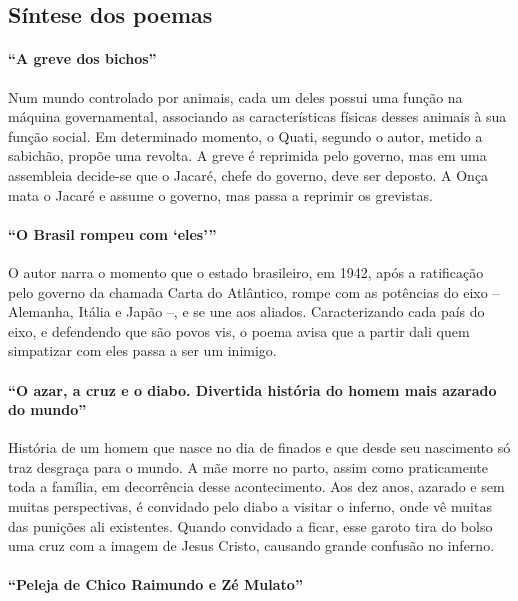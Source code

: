 \subsection{Síntese dos poemas}

\paragraph{``A greve dos bichos''}

Num mundo controlado por animais, cada um deles possui uma função na
máquina governamental, associando as características físicas desses
animais à sua função social. Em determinado momento, o Quati, segundo
o autor, metido a sabichão, propõe uma revolta. A greve é reprimida
pelo governo, mas em uma assembleia decide-se que o Jacaré,
chefe do governo, deve ser deposto. A Onça mata o Jacaré e assume o
governo, mas passa a reprimir os grevistas. 


\paragraph{``O Brasil rompeu com `eles'''}

O autor narra o momento que o estado brasileiro, em 1942, 
após a ratificação pelo governo da chamada Carta do Atlântico, 
rompe com as potências do eixo -- Alemanha, Itália e Japão --, e se une
aos aliados. Caracterizando cada país do eixo, e defendendo que são
povos vis, o poema avisa que a partir dali quem simpatizar com eles
passa a ser um inimigo.

\paragraph{``O azar, a cruz e o diabo. Divertida história do homem
mais azarado do mundo''}

História de um homem que nasce no dia de finados e que desde seu
nascimento só traz desgraça para o mundo. A mãe morre no parto, assim
como praticamente toda a família, em decorrência desse acontecimento.
Aos dez anos, azarado e sem muitas perspectivas, é convidado pelo diabo
a visitar o inferno, onde vê muitas das punições ali existentes. Quando
convidado a ficar, esse garoto tira do bolso uma cruz com a imagem de
Jesus Cristo, causando grande confusão no inferno.

\paragraph{``Peleja de Chico Raimundo e Zé Mulato''}

